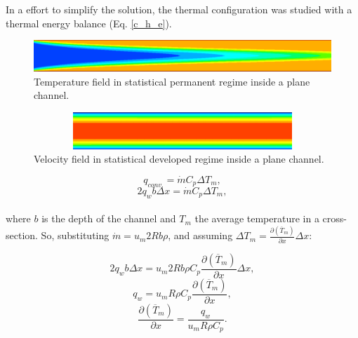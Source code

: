 \documentclass[10pt]{article} %
\begin{document}
In a effort to simplify the solution, the thermal configuration was studied with a thermal energy balance (Eq. \ref{c_h_e}).
\begin{figure}[h!]
	\centering
	\includegraphics[angle=0, scale=0.40]{fotos_formatacao_final/temperatura}
	\caption{Temperature field in statistical permanent regime inside a plane channel.}
	\label{figure.2}
\end{figure}
\begin{figure}[h!]
	\centering
	\includegraphics[angle=0, height=1.4cm , width=12.3cm]{fotos_formatacao_final/velocidade}
	\caption{Velocity field in statistical developed regime inside a plane channel.}
	\label{figure.3}
\end{figure}


\begin{equation}\label{c_h_e}
q_{conv.} = \dot{m} C_p \Delta T_m,
\end{equation}
\begin{equation}
2q_w b \Delta x = \dot{m} C_p \Delta T_m,
\end{equation}\\


{\parindent0pt where $b$ is the depth of the channel and $T_m$ the average temperature in a cross-section. So, substituting $ \dot{m} = u_m 2R b \rho $, and assuming $ \Delta T_m = \frac{\partial{\left(\overline{T}_m\right)}}{\partial{x}} \Delta x $:}

\begin{equation}
2q_w b \Delta x = u_m 2R b \rho  C_p \frac{\partial{\left(\overline{T}_m\right)}}{\partial{x}} \Delta x,
\end{equation}     
\begin{equation}
q_w = u_m R \rho  C_p \frac{\partial{\left(\overline{T}_m\right)}}{\partial{x}} ,
\end{equation} 
\begin{equation}\label{c_h_ee}
\frac{\partial{\left(\overline{T}_m\right)}}{\partial{x}} = \frac{q_w}{u_m  R \rho  C_p } .
\end{equation} 
\end{document}
